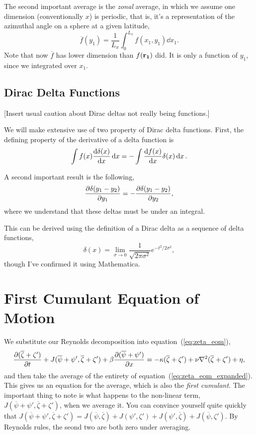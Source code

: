 \documentclass{paper}
\newcommand*{\reynolds}[1]{\mean{#1} + #1'}
\newcommand*{\mean}[1]{\overline{#1}}
\newcommand*{\zonal}[1]{\frac{1}{L_x} \int_0^{L_x} #1 \dd x_1}
\newcommand{\rr}[1]{\vb{r_{#1}}}
\begin{document}
The second important average is the \emph{zonal} average, in which we assume one dimension (conventionally $x$) is periodic, that is, it's a representation of the azimuthal angle on a sphere at a given latitude,
\begin{equation}
  \label{eq:zonal_average}
  \mean{f}(y_1) = \zonal{f(x_1, y_1)}. 
\end{equation}
Note that now $\mean{f}$ has lower dimension than $f(\rr1)$ did. It is only a function of $y_1$, since we integrated over $x_1$.

\subsection{Dirac Delta Functions}
\label{sec:dirac-delta-funct}

[Insert usual caution about Dirac deltas not really being functions.]

We will make extensive use of two property of Dirac delta functions. First, the defining property of the derivative of a delta function is
\begin{equation}
  \label{eq:dirac_derivative}
  \int f(x) \dv{\delta(x)}{x} \dd{x} = -\int \dv{f(x)}{x} \delta(x) \dd{x}.
\end{equation}

A second important result is the following,
\begin{equation}
  \label{eq:dirac_deriv_swap}
  \pdv{\delta(y_1 - y_2)}{y_1} = -\pdv{\delta(y_1 - y_2)}{y_2},
\end{equation}
where we understand that these deltas must be under an integral.

This can be derived using the definition of a Dirac delta as a sequence of delta functions,
\begin{equation}
  \label{eq:dirac_definition}
  \delta(x)  = \lim_{\sigma \to 0} \frac{1}{\sqrt{2\pi \sigma^2}} e^{-t^2/2\sigma^2},
\end{equation}
though I've confirmed it using Mathematica. 

\section{First Cumulant Equation of Motion}
\label{sec:first-cumul-equat}

We substitute our Reynolds decomposition into equation~(\ref{eq:zeta_eom}),
\begin{equation}
  \label{eq:zeta_eom_expanded}
  \pdv{(\reynolds{\zeta})}{t} + J(\reynolds{\psi}, \reynolds{\zeta}) + \beta \pdv{(\reynolds{\psi})}{x} = -\kappa (\reynolds{\zeta}) + \nu \laplacian{(\reynolds{\zeta})} + \eta,
\end{equation}
and then take the average of the entirety of equation~(\ref{eq:zeta_eom_expanded}). This gives us an equation for the average, which is also the \emph{first cumulant}. The important thing to note is what happens to the non-linear term, $J(\reynolds{\psi}, \reynolds{\zeta})$, when we average it. You can convince yourself quite quickly that $J(\reynolds{\psi}, \reynolds{\zeta}) = J(\mean{\psi}, \mean{\zeta}) + J(\psi', \zeta') + J(\psi', \mean{\zeta}) + J(\mean{\psi}, \zeta')$. By Reynolds rules, the seond two are both zero under averaging.
\end{document}
